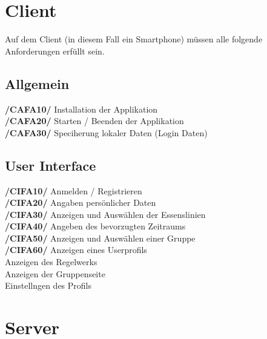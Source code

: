 \documentclass[a4paper]{scrreprt}
\begin{document}
\section{Client}
Auf dem Client (in diesem Fall ein Smartphone) müssen alle folgende Anforderungen erfüllt sein. 

\subsection{Allgemein}

\begin{addmargin}[25pt]{0pt} 
\textbf{/CAFA10/} Installation der Applikation \\
\textbf{/CAFA20/} Starten / Beenden der Applikation\\
\textbf{/CAFA30/} Speciherung lokaler Daten (Login Daten)\\
\end{addmargin}

\subsection{User Interface}

\begin{addmargin}[25pt]{0pt} 
\textbf{/CIFA10/} Anmelden / Registrieren \\
\textbf{/CIFA20/} Angaben persönlicher Daten\\
\textbf{/CIFA30/} Anzeigen und Auswählen der Essenslinien\\
\textbf{/CIFA40/} Angeben des bevorzugten Zeitraums\\
\textbf{/CIFA50/} Anzeigen und Auswählen einer Gruppe\\
\textbf{/CIFA60/} Anzeigen eines Userprofils\\
Anzeigen des Regelwerks\\
Anzeigen der Gruppenseite\\
Einstellngen des Profils\\
\end{addmargin}

\section{Server}
\end{document}
